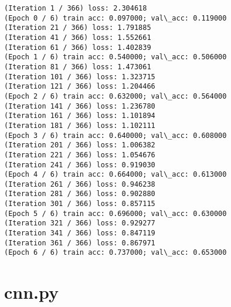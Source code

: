 \documentclass[11pt]{article}
\begin{document}
    \begin{Verbatim}[commandchars=\\\{\}]
(Iteration 1 / 366) loss: 2.304618
(Epoch 0 / 6) train acc: 0.097000; val\_acc: 0.119000
(Iteration 21 / 366) loss: 1.791885
(Iteration 41 / 366) loss: 1.552661
(Iteration 61 / 366) loss: 1.402839
(Epoch 1 / 6) train acc: 0.540000; val\_acc: 0.506000
(Iteration 81 / 366) loss: 1.473061
(Iteration 101 / 366) loss: 1.323715
(Iteration 121 / 366) loss: 1.204466
(Epoch 2 / 6) train acc: 0.632000; val\_acc: 0.564000
(Iteration 141 / 366) loss: 1.236780
(Iteration 161 / 366) loss: 1.101894
(Iteration 181 / 366) loss: 1.102111
(Epoch 3 / 6) train acc: 0.640000; val\_acc: 0.608000
(Iteration 201 / 366) loss: 1.006382
(Iteration 221 / 366) loss: 1.054676
(Iteration 241 / 366) loss: 0.919030
(Epoch 4 / 6) train acc: 0.664000; val\_acc: 0.613000
(Iteration 261 / 366) loss: 0.946238
(Iteration 281 / 366) loss: 0.902880
(Iteration 301 / 366) loss: 0.857115
(Epoch 5 / 6) train acc: 0.696000; val\_acc: 0.630000
(Iteration 321 / 366) loss: 0.929277
(Iteration 341 / 366) loss: 0.847119
(Iteration 361 / 366) loss: 0.867971
(Epoch 6 / 6) train acc: 0.737000; val\_acc: 0.653000

    \end{Verbatim}

    \hypertarget{cnn.py}{%
\section{cnn.py}\label{cnn.py}}
\end{document}
